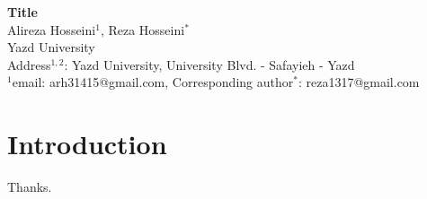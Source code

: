 \documentclass[11pt,twoside,openany]{article}
\begin{document}
	\begin{center}
		{\large \bf Title}\\
		\vspace{0.1cm}
		{Alireza Hosseini$^{1}$, Reza Hosseini$^*$}\\
		{Yazd University}\\
		{\small Address$^{1,2}$: Yazd University, University Blvd. - Safayieh - Yazd}\\
		{$^1$email: arh31415@gmail.com, Corresponding author$^*$: reza1317@gmail.com}
	\end{center}


\begin{abstract}
\end{abstract}

\section{Introduction}





\vspace{2cm}
 Thanks.
\end{document}

